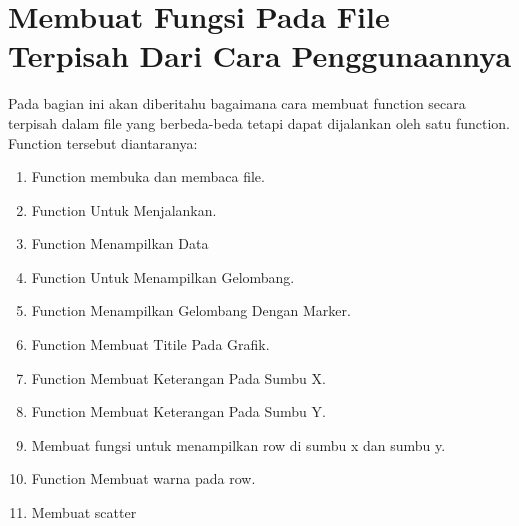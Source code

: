 \section{Membuat Fungsi Pada File Terpisah Dari Cara Penggunaannya}
Pada bagian ini akan diberitahu bagaimana cara membuat function secara terpisah dalam file yang berbeda-beda tetapi dapat dijalankan oleh satu function. Function tersebut diantaranya:
\begin{enumerate}
\item Function membuka dan membaca file.
\item Function Untuk Menjalankan.
\item Function Menampilkan Data
\item Function Untuk Menampilkan Gelombang.
\item Function Menampilkan Gelombang Dengan Marker.
\item Function Membuat Titile Pada Grafik.
\item Function Membuat Keterangan Pada Sumbu X.
\item Function Membuat Keterangan Pada Sumbu Y.
\item Membuat fungsi untuk menampilkan row di sumbu x dan sumbu y.
\item Function Membuat warna pada row.
\item Membuat scatter
\end{enumerate}

